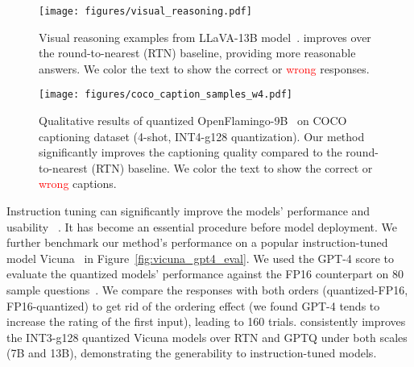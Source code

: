 \begin{figure*}[t]
    \centering
     \texttt{[image: figures/visual\_reasoning.pdf]}
    \caption{Visual reasoning examples from LLaVA-13B model~\cite{liu2023llava}. \methodshort improves over the round-to-nearest (RTN) baseline, providing more reasonable answers. We color the text to show the \textcolor{codegreen}{correct} or \textcolor{red}{wrong} responses. 
    } 
    \label{fig:visual_reasoning}
\end{figure*}

\begin{figure*}[t]
    \centering
     \texttt{[image: figures/coco\_caption\_samples\_w4.pdf]}
    \caption{Qualitative results of quantized OpenFlamingo-9B~\cite{openflamingo} on COCO captioning dataset (4-shot, INT4-g128 quantization). Our method significantly improves the captioning quality compared to the round-to-nearest (RTN) baseline. We color the text to show the \textcolor{codegreen}{correct} or \textcolor{red}{wrong} captions. }
    \label{fig:coco_sample}
\end{figure*}

Instruction tuning can significantly improve the models' performance and usability 
~\cite{wei2021finetuned,sanh2021multitask,ouyang2022training,chung2022scaling}. It has become an essential procedure before model deployment. We further benchmark our method's performance on a popular instruction-tuned model Vicuna~\cite{vicuna2023} in Figure~\ref{fig:vicuna_gpt4_eval}. We used the GPT-4 score to evaluate the quantized models' performance against the FP16 counterpart on 80 sample questions~\cite{vicuna2023}.
We compare the responses with both orders (quantized-FP16, FP16-quantized) to get rid of the ordering effect (we found GPT-4 tends to increase the rating of the first input), leading to 160 trials. 
\methodshort consistently improves the INT3-g128 quantized Vicuna models over RTN and GPTQ under both scales (7B and 13B), demonstrating the generability to instruction-tuned models.  
    

